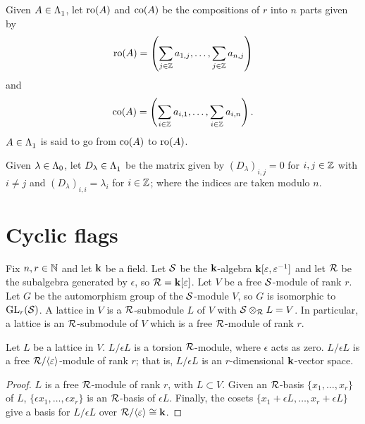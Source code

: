 \documentclass[a4paper, 11pt]{report}
\begin{document}
\begin{definition}\label{def:source-target}
Given $A\in\Lambda_1^{}$, let $\operatorname{ro}(A)$ and $\operatorname{co}(A)$ be the compositions of $r$ into $n$ parts given by
\begin{equation*}
\operatorname{ro}(A) = \left( \sum_{j\in\mathbb{Z}}a_{1,j}, \ldots, \sum_{j\in\mathbb{Z}} a_{n,j}\right)
\end{equation*}
and
\begin{equation*}
\operatorname{co}(A) = \left( \sum_{i\in\mathbb{Z}} a_{i,1}, \ldots, \sum_{i\in\mathbb{Z}} a_{i,n}\right).
\end{equation*}
$A\in\Lambda_1^{}$ is said to go from $\operatorname{co}(A)$ to $\operatorname{ro}(A)$.
\end{definition}

\begin{definition}\label{def:diagonal-matrices}
Given $\lambda\in{\Lambda_0}$, let $D_\lambda\in\Lambda_1^{}$ be the matrix given by $(D_\lambda)_{i,j}=0$ for $i,j\in\mathbb{Z}$ with $i\neq j$ and $(D_\lambda)_{i,i}=\lambda_i$ for $i\in\mathbb{Z}$; where the indices are taken modulo $n$.
\end{definition}

\section{Cyclic flags}

Fix $n,r\in\mathbb{N}$ and let $\mathbf{k}$ be a field. Let $\mathcal{S}$ be the $\mathbf{k}$-algebra $\mathbf{k}[\varepsilon,\varepsilon^{-1}]$ and let $\mathcal{R}$ be the subalgebra generated by $\epsilon$, so $\mathcal{R} = \mathbf{k}[\varepsilon]$. Let $V$ be a free $\mathcal{S}$-module of rank $r$. Let $G$ be the automorphism group of the $\mathcal{S}$-module $V$, so $G$ is isomorphic to $\operatorname{GL}_{r}(\mathcal{S})$. A lattice in $V$ is a $\mathcal{R}$-submodule $L$ of $V$ with $\mathcal{S}\otimes_{\mathcal{R}} L = V$. In particular, a lattice is an $\mathcal{R}$-submodule of $V$ which is a free $\mathcal{R}$-module of rank $r$.

\begin{lemma}
Let $L$ be a lattice in $V$. $L/{\epsilon L}$ is a torsion $\mathcal{R}$-module, where $\epsilon$ acts as zero. $L/{\epsilon L}$ is a free $\mathcal{R}/{\langle \varepsilon \rangle}$-module of rank $r$; that is, $L/{\epsilon L}$ is an $r$-dimensional $\mathbf{k}$-vector space.
\end{lemma}
\begin{proof}
$L$ is a free $\mathcal{R}$-module of rank $r$, with $L\subset V$. Given an $\mathcal{R}$-basis $\{x_1,\ldots,x_r\}$ of $L$, $\{\epsilon x_1,\ldots, \epsilon x_r\}$ is an $\mathcal{R}$-basis of $\epsilon L$. Finally, the cosets $\{ x_1 + \epsilon L,\ldots, x_r + \epsilon L\}$ give a basis for $L/{\epsilon L}$ over $\mathcal{R}/{\langle \varepsilon\rangle}\cong \mathbf{k}$.
\end{proof}
\end{document}
